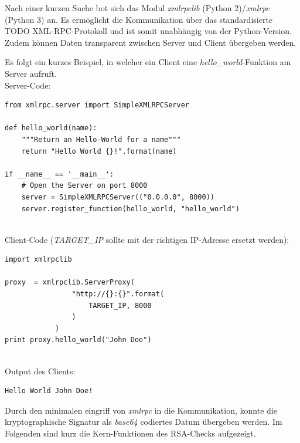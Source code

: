 Nach einer kurzen Suche bot sich das Modul \textit{xmlrpclib} (Python 2)/\textit{xmlrpc} (Python 3) an. Es ermöglicht die Kommunikation über das standardisierte TODO XML-RPC-Protokoll und ist somit unabhängig von der Python-Version. Zudem können Daten transparent zwischen Server und Client übergeben werden.

\newpage
Es folgt ein kurzes Beispiel, in welcher ein Client eine \textit{hello\_world}-Funktion am Server aufruft.\\

Server-Code:
\begin{lstlisting}
from xmlrpc.server import SimpleXMLRPCServer

def hello_world(name):
	"""Return an Hello-World for a name"""
    return "Hello World {}!".format(name)

if __name__ == '__main__':
	# Open the Server on port 8000
    server = SimpleXMLRPCServer(("0.0.0.0", 8000))
    server.register_function(hello_world, "hello_world")
\end{lstlisting}
$ $\\
Client-Code (\textit{TARGET\_IP} sollte mit der richtigen IP-Adresse ersetzt werden):
\begin{lstlisting}
import xmlrpclib

proxy  = xmlrpclib.ServerProxy(
                "http://{}:{}".format(
                    TARGET_IP, 8000
                )
            )
print proxy.hello_world("John Doe")
\end{lstlisting}
$ $\\
Output des Clients:
\begin{lstlisting}
Hello World John Doe!
\end{lstlisting}

Durch den minimalen eingriff von \textit{xmlrpc} in die Kommunikation, konnte die kryptographische Signatur als \textit{base64} codiertes Datum übergeben werden. Im Folgenden sind kurz die Kern-Funktionen des RSA-Checks aufgezeigt.\\


